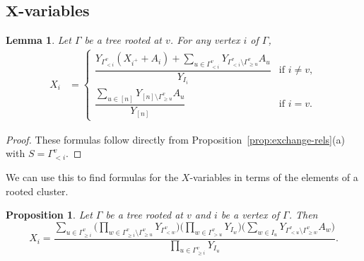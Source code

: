 \documentclass[pdftex]{sigma}
\numberwithin{equation}{section}
\newtheorem{Lemma}[Theorem]{Lemma}
\newtheorem{Proposition}[Theorem]{Proposition}
 { \theoremstyle{definition}
\newtheorem{Definition}[Theorem]{Definition}
\newtheorem{Note}[Theorem]{Note}
\newtheorem{Example}[Theorem]{Example}
\newtheorem{Remark}[Theorem]{Remark} }
\begin{document}
\subsection[X-variables]{$\boldsymbol{X}$-variables}\label{sec:X-formulas}
\begin{Lemma}\label{lem:X-formula-1}
Let $\Gamma$ be a tree rooted at $v$. For any vertex $i$ of $\Gamma$,
\begin{align*}
 X_i &= \begin{cases}
 \dfrac{Y_{\Gamma_{< i}^v}(X_{i^+}+A_i)+\sum_{u\in \Gamma_{< i}^v}Y_{\Gamma_{< i}^v\setminus\Gamma_{\geq u}^v}A_u}{Y_{I_i}} & \textrm{if } i \neq v, \\
 \dfrac{\sum_{u\in [n]}Y_{[n]\setminus\Gamma_{\geq u}^v}A_u}{Y_{[n]}} & \textrm{if } i = v.
 \end{cases}
\end{align*}
\end{Lemma}
\begin{proof}
These formulas follow directly from Proposition~\ref{prop:exchange-rels}(a) with $S=\Gamma_{< i}^v$.
\end{proof}
We can use this to find formulas for the $X$-variables in terms of the elements of a rooted cluster.
\begin{Proposition}\label{prop:X-formula-2}
Let $\Gamma$ be a tree rooted at $v$ and $i$ be a vertex of $\Gamma$. Then \[X_i=\frac{\sum_{u\in\Gamma_{\geq i}^v}\Big(\prod_{w\in\Gamma_{\geq i}^v\setminus\Gamma_{\geq u}^v} Y_{\Gamma_{< w}^v}\Big)\Big(\prod_{w\in\Gamma_{> u}^v} Y_{I_w}\Big)\Big(\sum_{w\in I_u}Y_{\Gamma_{< u}^v\setminus\Gamma_{\geq w}^v}A_w\Big)}{\prod_{u\in\Gamma_{\geq i}^v}Y_{I_u}}.\]
\end{Proposition}
\end{document}
